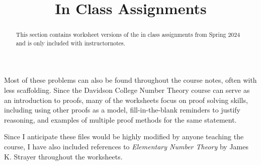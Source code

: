 \documentclass[handout]{ximera}
\title{In Class Assignments}\label{inclass}
\begin{document}
\begin{abstract}
	This section contains worksheet versions of the in class assignments from Spring 2024 and is only included with instructornotes.
\end{abstract}
 \maketitle
 
Most of these problems can also be found throughout the course notes, often with less scaffolding. Since the Davidson College Number Theory course can serve as an introduction to proofs, many of the worksheets focus on proof solving skills, including using other proofs as a model, fill-in-the-blank reminders to justify reasoning, and examples of multiple proof methods for the same statement.
 
 Since I anticipate these files would be highly modified by anyone teaching the course, I have also included references to \emph{Elementary Number Theory} by James K. Strayer throughout the worksheets.
 
\end{document}
